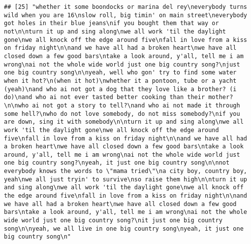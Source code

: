 \documentclass[]{article}
\begin{document}
\begin{verbatim}
## [25] "whether it some boondocks or marina del rey\neverybody turns wild when you are 16\nslow roll, big timin' on main street\neverybody got holes in their blue jeans\nif you bought them that way or not\n\nturn it up and sing along\nwe all work 'til the daylight gone\nwe all knock off the edge around five\nfall in love from a kiss on friday night\n\nand we have all had a broken heart\nwe have all closed down a few good bars\ntake a look around, y'all, tell me i am wrong\nai not the whole wide world just one big country song?\njust one big country song\n\nyeah, well who gon' try to find some water when it hot?\n(when it hot)\nwhether it a pontoon, tube or a yacht (yeah)\nand who ai not got a dog that they love like a brother? (i do)\nand who ai not ever tasted better cooking than their mother?\n\nwho ai not got a story to tell?\nand who ai not made it through some hell?\nwho do not love somebody, do not miss somebody?\nif you are down, sing it with somebody\n\nturn it up and sing along\nwe all work 'til the daylight gone\nwe all knock off the edge around five\nfall in love from a kiss on friday night\n\nand we have all had a broken heart\nwe have all closed down a few good bars\ntake a look around, y'all, tell me i am wrong\nai not the whole wide world just one big country song?\nyeah, it just one big country song\n\nnot everybody knows the words to \"mama tried\"\na city boy, country boy, yeah\nwe all just tryin' to survive\nso raise them high\n\nturn it up and sing along\nwe all work 'til the daylight gone\nwe all knock off the edge around five\nfall in love from a kiss on friday night\n\nand we have all had a broken heart\nwe have all closed down a few good bars\ntake a look around, y'all, tell me i am wrong\nai not the whole wide world just one big country song?\nit just one big country song\n\nyeah, we all live in one big country song\nyeah, it just one big country song\n"                                                                                                                                                                                                                                                                                                                                                                                                                                                                                                                                                                                                                                                                                                                                                                                                                                                                                                                                                                                                   

\end{verbatim}
\end{document}
